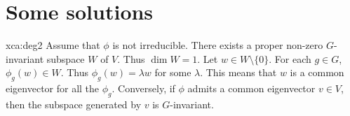 \chapter*{Some solutions}

\pagestyle{plain}
\fancyhf{}
\fancyfoot[CE,CO]{\leftmark}
\fancyfoot[LE,RO]{\thepage}


\begin{sol}{xca:deg2}
  Assume that $\phi$ is not irreducible. There exists a proper non-zero $G$-invariant 
  subspace $W$ of $V$. Thus $\dim W=1$. Let $w\in W\setminus\{0\}$.
  For each $g\in G$, $\phi_g(w)\in W$. Thus $\phi_g(w)=\lambda w$ for some 
  $\lambda$. This means that $w$ is a common eigenvector for all the $\phi_g$.
  Conversely, if $\phi$ admits a common eigenvector $v\in V$, then 
  the subspace generated by $v$ is $G$-invariant.
\end{sol}

